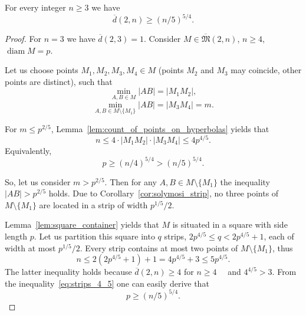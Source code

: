 \documentclass[11pt,twoside,draft
]{article}
\begin{document}
\begin{Theorem}
	\label{thm:main_result}
	For every integer $n \geq 3$ we have
	\begin{equation}
		\overline{d}(2,n) \geq (n/5)^{5/4}
		.
	\end{equation}
\end{Theorem}

\begin{proof}[Proof]
	For $n = 3$ we have $\overline{d}(2,3) = 1$.
	Consider $M\in\overline{\mathfrak{M}}(2,n)$, $n \geq 4$, $\operatorname{diam} M = p$.

	Let us choose points $M_1, M_2, M_3, M_4 \in M$
	(points $M_2$ and $M_3$ may coincide, other points are distinct), such that
	\begin{equation}
		\min_{A, B \in M} |AB| = |M_1 M_2|
		,
	\end{equation}
	\begin{equation}
		\min_{A, B \in M \setminus \{M_1\}} |AB| = |M_3 M_4| = m
		.
	\end{equation}

	For $m \leq p^{2/5}$, Lemma~\ref{lem:count_of_points_on_hyperbolas} yields that
	\begin{equation}
		n \leq 4 \cdot |M_1 M_2| \cdot |M_3 M_4| \leq  4 p^{4/5}
		.
	\end{equation}
	Equivalently,
	\begin{equation}
		\label{eq:hyperbolas_5_4}
		p \geq (n/4) ^ {5/4} > (n/5) ^ {5/4}
		.
	\end{equation}

	So, let us consider $m > p^{2/5}$.
	Then for any $A,B \in M\setminus\{M_1\}$ the inequality $|AB| > p^{2/5}$ holds.
	Due to Corollary~\ref{cor:solymosi_strip}, no three points of $M\setminus\{M_1\}$
	are located in a strip of width $p^{1/5} / 2$.



	Lemma~\ref{lem:square_container} yields that $M$ is situated in a square with side length $p$.
	Let us partition this square into $q$ strips, $2p^{4/5} \leq q < 2p^{4/5} + 1$, each of width at most $p^{1/5} / 2$.
	Every strip contains at most two points of  $M\setminus\{M_1\}$,
	thus
	\begin{equation}
		\label{eq:strips_4_5}
		n \leq 2(2p^{4/5} + 1) + 1
		= 4p^{4/5}+3
		\leq 5 p^{4/5}
		.
	\end{equation}
	The latter inequality holds because $\overline{d}(2,n) \geq 4$ for $n\geq 4$~~\cite{kurz2008minimum}
	and $4^{4/5}>3$.
	From the inequality~\eqref{eq:strips_4_5} one can easily derive that
	\begin{equation}
		\label{eq:strips_5_4}
		p \geq (n/5) ^ {5/4}
		.
	\end{equation}
\end{proof}
\end{document}
